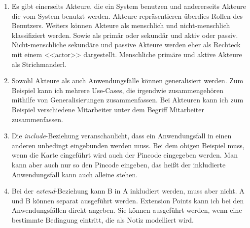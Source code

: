 \documentclass[a4paper, 12pt, margins=2.5cm]{homework}
\begin{document}
  
  \begin{problem}
    
  \end{problem}
  \begin{solution}\hfill
    \begin{enumerate}[label=\alph*)]\itemsep0pt
      \item Es gibt einerseits Akteure, die ein System benutzen und andererseits
            Akteure die vom System benutzt werden. Akteure repräsentieren überdies
            Rollen des Benutzers. Weiters können Akteure als menschlich und
            nicht-menschlich klassifiziert werden. Sowie als primär oder sekundär
            und aktiv oder passiv.
            Nicht-menschliche sekundäre und passive Akteure werden eher als Rechteck
            mit einem <<actor>> dargestellt. Menschliche primäre und aktive Akteure
            als Strichmanderl.

      \item Sowohl Akteure als auch Anwendungsfälle können generalisiert werden.
            Zum Beispiel kann ich mehrere Use-Cases, die irgendwie zusammengehören
            mithilfe von Generalisierungen zusammenfassen. Bei Akteuren kann ich
            zum Beispiel verschiedene Mitarbeiter unter dem Begriff Mitarbeiter 
            zusammenfassen.

      \item Die \emph{include}-Beziehung veranschaulicht, dass ein Anwendungsfall
            in einen anderen unbedingt eingebunden werden muss. Bei dem obigen
            Beispiel muss, wenn die Karte eingeführt wird auch der Pincode eingegeben
            werden. Man kann aber auch nur so den Pincode eingeben, das heißt 
            der inkludierte Anwendungsfall kann auch alleine stehen.

      \item Bei der \emph{extend}-Beziehung kann B in A inkludiert werden, muss
            aber nicht. A und B können separat ausgeführt werden. Extension Points
            kann ich bei den Anwendungsfällen direkt angeben. Sie können ausgeführt
            werden, wenn eine bestimmte Bedingung eintritt, die als Notiz modelliert
            wird.  
    \end{enumerate}
    
  \end{solution}
  
\end{document}
